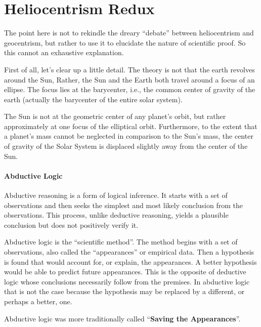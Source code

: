 \section{Heliocentrism Redux}

The point here is not to rekindle the dreary ``debate'' between heliocentrism and geocentrism, but rather to use it to elucidate the nature of scientific proof. So this cannot an exhaustive explanation.

First of all, let's clear up a little detail. The theory is not that the earth revolves around the Sun, Rather, the Sun and the Earth both travel around a focus of an ellipse. The focus lies at the barycenter, i.e., the common center of gravity of the earth (actually the barycenter of the entire solar system).

\begin{quotex}
The Sun is not at the geometric center of any planet's orbit, but rather approximately at one focus of the elliptical orbit. Furthermore, to the extent that a planet's mass cannot be neglected in comparison to the Sun's mass, the center of gravity of the Solar System is displaced slightly away from the center of the Sun. 
\end{quotex}


\paragraph{Abductive Logic}


\begin{quotex}
Abductive reasoning is a form of logical inference. It starts with a set of observations and then seeks the simplest and most likely conclusion from the observations. This process, unlike deductive reasoning, yields a plausible conclusion but does not positively verify it.
\end{quotex}


Abductive logic is the ``scientific method''. The method begins with a set of observations, also called the ``appearances'' or empirical data. Then a hypothesis is found that would account for, or explain, the appearances. A better hypothesis would be able to predict future appearances. This is the opposite of deductive logic whose conclusions necessarily follow from the premises. In abductive logic that is not the case because the hypothesis may be replaced by a different, or perhaps a better, one.

Abductive logic was more traditionally called ``\textbf{Saving the Appearances}''.

